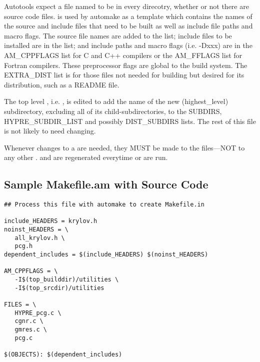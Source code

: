 Autotools expect a file named  to be in every direcotry, whether
or not there are source code files.   is used by automake as a
template which contains the names of the source and include files that need to 
be built as well as include file paths and macro flags.  The source file names 
are added to the  list; include files to be installed are in the 
 list; and include paths and macro flags (i.e. -Dxxx) are 
in the AM\_CPPFLAGS list for C and C++ compilers or the AM\_FFLAGS list for Fortran
compilers.  These preprocessor flags are global to the build system.  The 
EXTRA\_DIST list is for those files not needed for building \hypre{} but desired 
for its distribution, such as a README file. 

The top level , i.e. , is 
edited to add the name of the new (highest\_level) subdirectory, excluding all of
its child-subdirectories, to the SUBDIRS, HYPRE\_SUBDIR\_LIST and possibly 
DIST\_SUBDIRS lists.  The rest of this file is not likely to need changing.

Whenever changes to a  are needed, they MUST be made to the 
files---NOT to any other .
 and  are regenerated everytime 
or  are run.

\subsection{Sample Makefile.am with Source Code}
\label{Sample Makefile.am with Source Code}

\begin{verbatim}
## Process this file with automake to create Makefile.in

include_HEADERS = krylov.h
noinst_HEADERS = \
   all_krylov.h \
   pcg.h
dependent_includes = $(include_HEADERS) $(noinst_HEADERS)

AM_CPPFLAGS = \
   -I$(top_builddir)/utilities \
   -I$(top_srcdir)/utilities 

FILES = \
   HYPRE_pcg.c \
   cgnr.c \
   gmres.c \
   pcg.c

$(OBJECTS): $(dependent_includes)

\end{verbatim}

